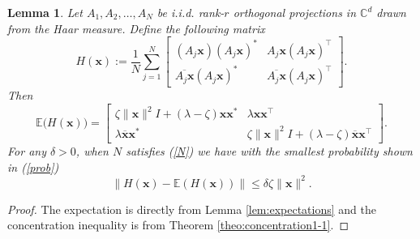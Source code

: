 \documentclass{article}
\renewcommand{\eqref}[1]{(\ref{#1})}
\newcommand{\C}{{\mathbb C}}
\newcommand{\E}{{\mathbb E}}
\newcommand{\vx}{{\mathbf x}}
\newcommand{\0}{{\mathbf 0}}
\newtheorem{lemma}[theorem]{Lemma}
\numberwithin{equation}{section}
\begin{document}
	
	\begin{lemma} \label{lem:concentration1}
		Let $A_1,A_2,\ldots,A_N$ be i.i.d. rank-$r$ orthogonal projections in $\C^d$ drawn from the Haar measure. Define the following matrix
		$$
		H(\vx):=\frac{1}{N}\sum^N_{j=1}\begin{bmatrix}
			(A_j\vx) (A_j\vx)^* & A_j\vx( A_j\vx)^\top \\
			\overline{A_j\vx}( A_j\vx)^* & \overline{A_j\vx}( A_j\vx)^\top 
		\end{bmatrix}.
		$$ Then 
		$$
		\E\big(H(\vx)\big)
		=\begin{bmatrix}
			\zeta\|\vx\|^2I+(\lambda-\zeta)\vx\vx^* & \lambda\vx\vx^\top  \\
			\lambda\overline{\vx}\vx^* & \zeta\|\vx\|^2I+(\lambda-\zeta)\overline{\vx}\vx^\top 
		\end{bmatrix}.
		$$
		For any $\delta>0$, when $N$ satisfies \eqref{N} we have with the smallest probability shown in \eqref{prob}
		$$
		\|H(\vx)-\E( H(\vx))\|\le\delta\zeta \|\vx\|^2.
		$$
	\end{lemma}
	\begin{proof} 
		The expectation is directly from Lemma \ref{lem:expectations} and the concentration inequality is from Theorem 
		\ref{theo:concentration1-1}.
	\end{proof}
	
\end{document}
